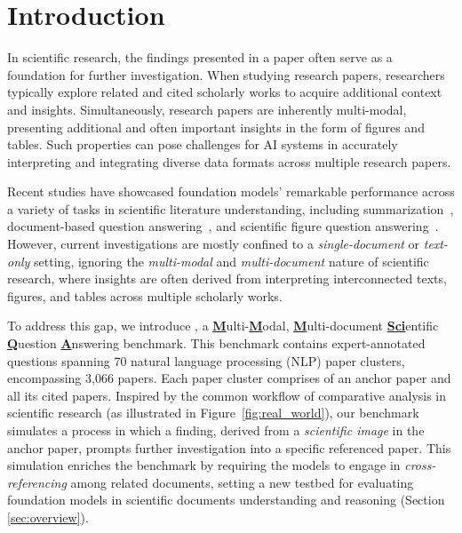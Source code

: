 

\section{Introduction}

In scientific research, the findings presented in a paper often serve as a foundation for further investigation. When studying research papers, researchers typically explore related and cited scholarly works to acquire additional context and insights. Simultaneously, research papers are inherently multi-modal, presenting additional and often important insights in the form of figures and tables. Such properties can pose challenges for AI systems in accurately interpreting and integrating diverse data formats across multiple research papers.


Recent studies have showcased foundation models' remarkable performance across a variety of tasks in scientific literature understanding, including summarization~\citep{goyal2023news, liu2023benchmarking}, document-based question answering~\citep{newman-etal-2023-question, zhao-etal-2024-docmath, xu2024kiwi}, and scientific figure question answering~\citep{masry2022chartqa, yue2023mmmu, lu2024mathvista}.
%
However, current investigations are mostly confined to a \emph{single-document} or \emph{text-only} setting, ignoring the \emph{multi-modal} and \emph{multi-document} nature of scientific research, where insights are often derived from interpreting interconnected texts, figures, and tables across multiple scholarly works. 

To address this gap, we introduce \data, a \underline{\textbf{M}}ulti-\underline{\textbf{M}}odal, \underline{\textbf{M}}ulti-document \underline{\textbf{Sci}}entific \underline{\textbf{Q}}uestion \underline{\textbf{A}}nswering benchmark. 
%
This benchmark contains \datanum expert-annotated questions spanning 70 natural language processing (NLP) paper clusters, encompassing 3,066 papers. 
%
Each paper cluster comprises of an anchor paper and all its cited papers.
%
Inspired by the common workflow of comparative analysis in scientific research (as illustrated in Figure~\ref{fig:real_world}), our benchmark simulates a process in which a finding, derived from a \emph{scientific image} in the anchor paper, 
prompts further investigation into a specific referenced paper.
%
This simulation enriches the benchmark by requiring the models to engage in \emph{cross-referencing} among related documents, setting a new testbed for evaluating foundation models in scientific documents understanding and reasoning (Section \ref{sec:overview}). 

